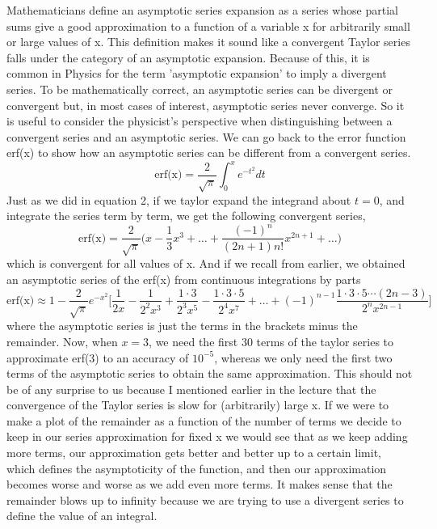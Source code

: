 \documentclass{article}
\newcommand{\be}{\begin{equation}}
\newcommand{\ee}{\end{equation}}
\begin{document}
Mathematicians define an asymptotic series expansion as a series whose partial sums give a good approximation to a function of a variable x for arbitrarily small or large values of x.
This definition makes it sound like a convergent Taylor series falls under the category of an asymptotic expansion.
Because of this, it is common in Physics for the term 'asymptotic expansion' to imply a divergent series.
To be mathematically correct, an asymptotic series can be divergent or convergent but, in most cases of interest, asymptotic series never converge.
So it is useful to consider the physicist's perspective when distinguishing between a convergent series and an asymptotic series.
We can go back to the error function erf(x) to show how an asymptotic series can be different from a convergent series.
\be
  \text{erf(x)} = \frac{2}{\sqrt{\pi}} \int_0^x e^{-t^2} dt
\ee
Just as we did in equation 2, if we taylor expand the integrand about $t=0$, and integrate the series term by term, we get the following convergent series,
\be
  \text{erf(x)} = \frac{2}{\sqrt{\pi}} \Big( x - \frac{1}{3}x^3 + \hdots + \frac{(-1)^n}{(2n+1)n!} x^{2n+1} + \hdots \Big)
\ee
which is convergent for all values of x.
And if we recall from earlier, we obtained an asymptotic series of the erf(x) from continuous integrations by parts
\be
  \text{erf(x)} \approx 1 - \frac{2}{\sqrt{\pi}} e^{-x^2} \Big[ \frac{1}{2x} - \frac{1}{2^2 x^3} + \frac{1 \cdot 3}{2^3 x^5} - \frac{1 \cdot 3 \cdot 5}{2^4 x^7} + \hdots + (-1)^{n-1} \frac{1 \cdot 3 \cdot 5 \cdots (2n-3)}{2^n x^{2n-1}} \Big]
\ee
where the asymptotic series is just the terms in the brackets minus the remainder.
Now, when $x=3$, we need the first 30 terms of the taylor series to approximate erf(3) to an accuracy of $10^{-5}$, whereas we only need the first two terms of the asymptotic series to obtain the same approximation.
This should not be of any surprise to us because I mentioned earlier in the lecture that the convergence of the Taylor series is slow for (arbitrarily) large x.
If we were to make a plot of the remainder as a function of the number of terms we decide to keep in our series approximation for fixed x
we would see that as we keep adding more terms, our approximation gets better and better up to a certain limit, which defines the asymptoticity of the function, and then our approximation becomes worse and worse as we add even more terms.
It makes sense that the remainder blows up to infinity because we are trying to use a divergent series to define the value of an integral.
\end{document}
